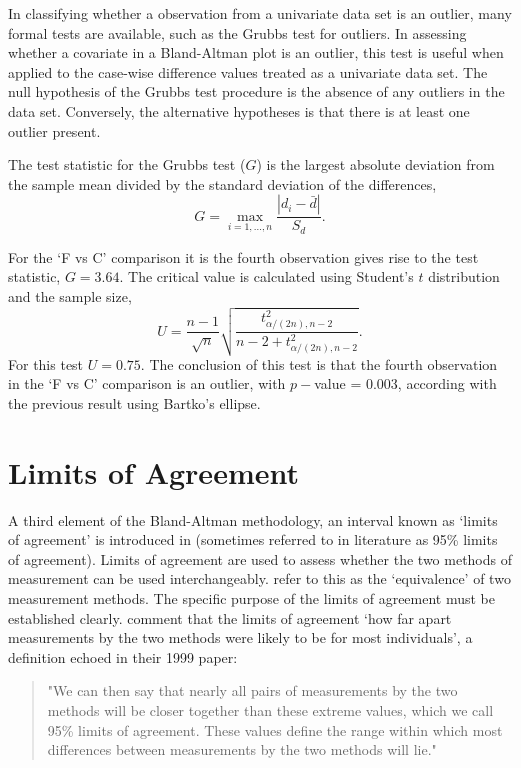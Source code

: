 \documentclass[12pt, a4paper]{report}
\theoremstyle{plain}
\theoremstyle{definition}
\theoremstyle{remark}
\begin{document}
In classifying whether a observation from a univariate data set is
an outlier, many formal tests are available, such as the Grubbs test for outliers. In assessing
whether a covariate in a Bland-Altman plot is an outlier, this
test is useful when applied to the case-wise difference values treated as a
univariate data set. The null hypothesis of the Grubbs test procedure is the absence
of any outliers in the data set. Conversely, the alternative hypotheses is that there is at least one outlier
present.

The test statistic for the Grubbs test ($G$) is the largest
absolute deviation from the sample mean divided by the standard
deviation of the differences,
\[
G =  \displaystyle\max_{i=1,\ldots, n}\frac{\left \vert d_i -
\bar{d}\right\vert}{S_{d}}.
\]

For the `F vs C' comparison it is the fourth observation gives
rise to the test statistic, $G = 3.64$. The critical value is
calculated using Student's $t$ distribution and the sample size,
\[
U = \frac{n-1}{\sqrt{n}} \sqrt{\frac{t_{\alpha/(2n),n-2}^2}{n - 2
+ t_{\alpha/(2n),n-2}^2}}.
\]
For this test $U = 0.75$. The conclusion of this test is that the fourth observation in the `F vs C' comparison is an outlier, with $p-$value = 0.003, according with the previous result using Bartko's ellipse.

\newpage


\section{Limits of Agreement}
A third element of the Bland-Altman methodology, an interval known
as `limits of agreement' is introduced in \citet*{BA86}
(sometimes referred to in literature as 95\% limits of agreement).
Limits of agreement are used to assess whether the two methods of
measurement can be used interchangeably. \citet{BA86} refer to
this as the `equivalence' of two measurement methods. The specific purpose of the limits of
agreement must be
established clearly. \citet*{BA95} comment that the limits of agreement `how
far apart measurements by the two methods were likely to be for
most individuals', a definition echoed in their 1999 paper:

\begin{quote}"We can then say that nearly all pairs
of measurements by the two methods will be closer together than
these extreme values, which we call 95\% limits of agreement.
These values define the range within which most differences
between measurements by the two methods will lie."
\end{quote}
\end{document}
